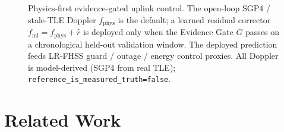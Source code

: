 \documentclass[conference]{IEEEtran}
\begin{document}
\begin{figure}[t]
{}
    \caption{Physics-first evidence-gated uplink control. The open-loop SGP4 /
    stale-TLE Doppler $f_{\mathrm{phys}}$ is the default; a learned residual
    corrector $f_{\mathrm{ml}}=f_{\mathrm{phys}}+\hat r$ is deployed only when the
    Evidence Gate $G$ passes on a chronological held-out validation window. The
    deployed prediction feeds LR-FHSS guard / outage / energy control proxies.
    All Doppler is model-derived (SGP4 from real TLE);
    \texttt{reference\_is\_measured\_truth=false}.}
    \label{fig:architecture}
\end{figure}

\section{Related Work}
\label{sec:related}
\end{document}
